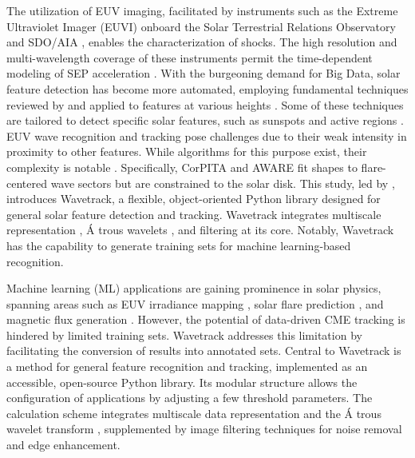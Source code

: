 The utilization of EUV imaging, facilitated by instruments such as the Extreme Ultraviolet Imager (EUVI) onboard the Solar Terrestrial Relations Observatory \citep[STEREO]{wuelser_2004} and SDO/AIA \citep{lemen_2012}, enables the characterization of shocks. The high resolution and multi-wavelength coverage of these instruments permit the time-dependent modeling of SEP acceleration \citep{kozarev_2016, kozarev_2017, kozarev_2019}. With the burgeoning demand for Big Data, solar feature detection has become more automated, employing fundamental techniques reviewed by \citet{aschwanden_2010} and applied to features at various heights \citep{perez_Suarez_2011}. Some of these techniques are tailored to detect specific solar features, such as sunspots and active regions \citep{curto_2008}.
EUV wave recognition and tracking pose challenges due to their weak intensity in proximity to other features. While algorithms for this purpose exist, their complexity is notable \citep{podladchikova_2005, verbeeck_2014, long_2014, ireland_2019}. Specifically, CorPITA \citep{long_2014} and AWARE \citep{ireland_2019} fit shapes to flare-centered wave sectors but are constrained to the solar disk.
This study, led by \citet{stepanyuk_2022}, introduces Wavetrack, a flexible, object-oriented Python library designed for general solar feature detection and tracking. Wavetrack integrates multiscale representation \citep{starck_2002}, \'A trous wavelets \citep{akansu_1991, holschneider_1989}, and filtering at its core. Notably, Wavetrack has the capability to generate training sets for machine learning-based recognition.

Machine learning (ML) applications are gaining prominence in solar physics, spanning areas such as EUV irradiance mapping \citep{szenicer_2019}, solar flare prediction \citep{li_2013}, and magnetic flux generation \citep{kim_2019}. However, the potential of data-driven CME tracking is hindered by limited training sets. Wavetrack addresses this limitation by facilitating the conversion of results into annotated sets.
Central to Wavetrack is a method for general feature recognition and tracking, implemented as an accessible, open-source Python library. Its modular structure allows the configuration of applications by adjusting a few threshold parameters. The calculation scheme integrates multiscale data representation \citep{starck_2002} and the \'A trous wavelet transform \citep{akansu_1991, holschneider_1989}, supplemented by image filtering techniques for noise removal and edge enhancement.


